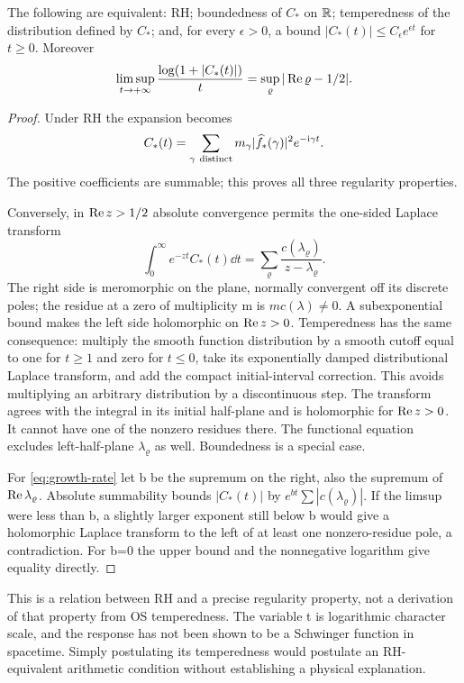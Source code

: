 \begin{theorem}\label{thm:probe-criterion}
The following are equivalent: RH; boundedness of $C_*$ on
$\mathbb R$; temperedness of the distribution defined by $C_*$;
and, for every $\epsilon>0$, a bound
$|C_*(t)|\le C_\epsilon e^{\epsilon t}$ for $t\ge0$.
Moreover
\begin{equation}\label{eq:growth-rate}
\limsup_{t\to+\infty}\frac{\log(1+|C_*(t)|)}{t}
=\sup_\varrho|\operatorname{Re}\varrho-1/2|.
\end{equation}
\end{theorem}
\begin{proof}
Under RH the expansion becomes
\begin{equation}\label{eq:C-positive}
C_*(t)=\sum_{\gamma\ {\rm distinct}}
m_\gamma|\widehat f_*(\gamma)|^2e^{-\mathrm i\gamma t}.
\end{equation}
The positive coefficients are summable; this proves all
three regularity properties.

Conversely, in $\operatorname{Re} z>1/2$ absolute convergence permits
the one-sided Laplace transform
\begin{equation}\label{eq:laplace-probe}
\int_0^\infty e^{-zt}C_*(t)\dd t
=\sum_\varrho\frac{c(\lambda_\varrho)}{z-\lambda_\varrho}.
\end{equation}
The right side is meromorphic on the plane, normally
convergent off its discrete poles; the residue at a zero
of multiplicity m is $m c(\lambda)\ne0$.
A subexponential bound makes the left side holomorphic
on $\operatorname{Re} z>0$. Temperedness has the same consequence:
multiply the smooth function distribution by a smooth
cutoff equal to one for $t\ge1$ and zero for $t\le0$,
take its exponentially damped distributional Laplace
transform, and add the compact initial-interval correction.
This avoids multiplying an arbitrary distribution by a
discontinuous step. The transform agrees with the integral
in its initial half-plane and is holomorphic for $\operatorname{Re} z>0$.
It cannot have one of the nonzero residues there.
The functional equation excludes left-half-plane
$\lambda_\varrho$ as well. Boundedness is a special case.

For \eqref{eq:growth-rate} let b be the supremum on the
right, also the supremum of $\operatorname{Re}\lambda_\varrho$.
Absolute summability bounds $|C_*(t)|$ by
$e^{bt}\sum|c(\lambda_\varrho)|$. If the limsup were
less than b, a slightly larger exponent still below b
would give a holomorphic Laplace transform to the left
of at least one nonzero-residue pole, a contradiction.
For b=0 the upper bound and the nonnegative logarithm
give equality directly.
\end{proof}
This is a relation between RH and a precise regularity
property, not a derivation of that property from OS
temperedness. The variable t is logarithmic character
scale, and the response has not been shown to be a
Schwinger function in spacetime. Simply postulating its
temperedness would postulate an RH-equivalent arithmetic
condition without establishing a physical explanation.

